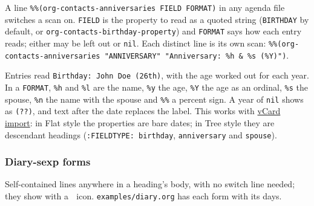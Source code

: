 \documentclass[11pt]{article}
\begin{document}
A line \texttt{\%\%(org-contacts-anniversaries FIELD FORMAT)} in any agenda file switches a scan on. \texttt{FIELD} is the property to read as a quoted string (\texttt{BIRTHDAY} by default, or \texttt{org-contacts-birthday-property}) and \texttt{FORMAT} says how each entry reads; either may be left out or \texttt{nil}. Each distinct line is its own scan: \texttt{\%\%(org-contacts-anniversaries "ANNIVERSARY" "Anniversary: \%h \& \%s (\%Y)")}.

Entries read \texttt{Birthday: John Doe (26th)}, with the age worked out for each year. In a \texttt{FORMAT}, \texttt{\%h} and \texttt{\%l} are the name, \texttt{\%y} the age, \texttt{\%Y} the age as an ordinal, \texttt{\%s} the spouse, \texttt{\%n} the name with the spouse and \texttt{\%\%} a percent sign. A year of \texttt{nil} shows as \texttt{(??)}, and text after the date replaces the label. This works with \hyperref[sec:org7f0c526]{vCard import}: in Flat style the properties are bare dates; in Tree style they are descendant headings (\texttt{:FIELDTYPE: birthday}, \texttt{anniversary} and \texttt{spouse}).

\subsubsection{Diary-sexp forms}
\label{sec:org0188e97}
Self-contained lines anywhere in a heading's body, with no switch line needed; they show with a 🔁 icon. \texttt{examples/diary.org} has each form with its days.
\end{document}
